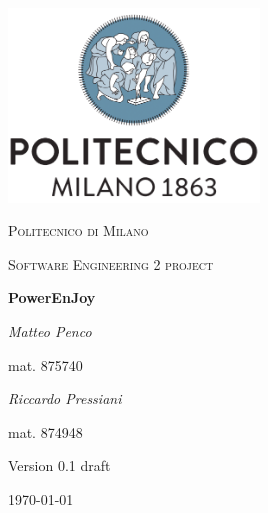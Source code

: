 \documentclass{report}
\begin{document}
\begin{titlepage}
	\centering
	\includegraphics[width=0.5\textwidth]{polimi-logo}\par\vspace{1cm}
	{\scshape\LARGE Politecnico di Milano\par}
	\vspace{1cm}
	{\scshape\Large Software Engineering 2 project\par}
	\vspace{1.5cm}
	{\huge\bfseries PowerEnJoy\par}
	\vspace{2cm}
	\begin{multicols}{2}
		{\Large\itshape Matteo Penco\par}
		\vspace{0.25cm}
		mat. 875740
		\vfill\columnbreak
		{\Large\itshape Riccardo Pressiani\par}
		\vspace{0.25cm}
		mat. 874948
	\end{multicols}
	
	\vfill
	
	{\Large Version 0.1 draft\par}
	\vspace{1.25cm}
	{\large \today\par}
\end{titlepage}

\begin{versionhistory}
\end{versionhistory}

\tableofcontents






\listoffigures
\begingroup
\let\clearpage\relax
\listoftables
\endgroup



\end{document}
